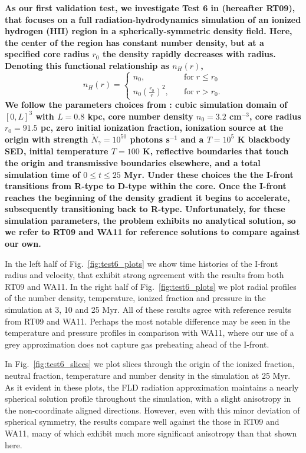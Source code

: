 {\bf As our first validation test, we investigate Test 6 in
\cite{IlievEtAl2009} (hereafter RT09), that focuses on a full
radiation-hydrodynamics simulation of an ionized hydrogen (HII)
region in a spherically-symmetric density field.  Here, the center of
the region has constant number density, but at a specified core radius
$r_0$ the density rapidly decreases with radius.  Denoting this
functional relationship as $n_H(r)$, 
\[
   n_H(r) = \begin{cases}
     n_0,\quad&\text{for}\; r\le r_0\\
     n_0\left(\frac{r_0}{r}\right)^{2},\quad&\text{for}\; r> r_0.
   \end{cases}
\]
We follow the parameters choices from \cite{IlievEtAl2009}:  cubic
simulation domain of $[0,L]^3$ with $L=0.8$ kpc, core number density
$n_0 = 3.2$ cm$^{-3}$, core radius $r_0 = 91.5$ pc, zero initial
ionization fraction, ionization source at the origin with strength
$\dot{N}_{\gamma}=10^{50}$ photons s$^{-1}$ and a $T=10^5$ K blackbody
SED, initial temperature $T = 100$ K, reflective boundaries that touch
the origin and transmissive boundaries elsewhere, and a total
simulation time of $0\le t\le 25$ Myr.  Under these choices the
the I-front transitions from R-type to D-type within the core.  Once
the I-front reaches the beginning of the density gradient it begins to
accelerate, subsequently transitioning back to R-type.  Unfortunately,
for these simulation parameters, the problem exhibits no analytical
solution, so we refer to RT09 and WA11 for reference solutions to
compare against our own.

In the left half of Fig.~\ref{fig:test6_plots} we show time histories
of the I-front radius and velocity, that exhibit strong agreement with
the results from both RT09 and WA11.  In the right half of 
Fig.~\ref{fig:test6_plots} we plot radial profiles of the number
density, temperature, ionized fraction and pressure in the simulation
at 3, 10 and 25 Myr.  All of these results agree with reference
results from RT09 and WA11.  Perhaps the most notable difference may
be seen in the temperature and pressure profiles in comparison with
WA11, where our use of a grey approximation does not capture gas
preheating ahead of the I-front.

In Fig.~\ref{fig:test6_slices} we plot slices through the origin
of the ionized fraction, neutral fraction, temperature and number
density in the simulation at 25 Myr.  As it evident in these plots,
the FLD radiation approximation maintains a nearly spherical solution
profile throughout the simulation, with a slight anisotropy in the
non-coordinate aligned directions.  However, even with this minor
deviation of spherical symmetry, the results compare well against the
those in RT09 and WA11, many of which exhibit much more significant
anisotropy than that shown here. }



